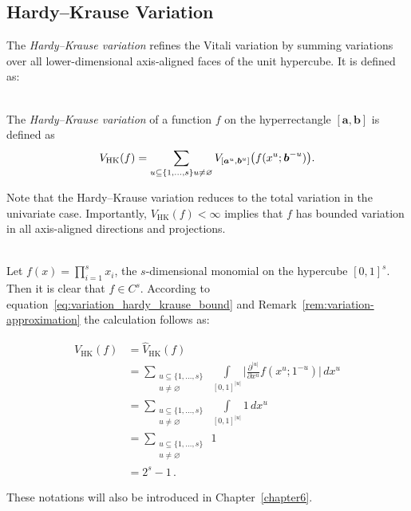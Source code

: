 \subsection{Hardy--Krause Variation}
\label{sec:hk-variation}

The \emph{Hardy--Krause variation } refines the Vitali variation by summing
variations over all lower-dimensional axis-aligned faces of the unit hypercube.
It is defined as:

\begin{definition} \ \\
The \emph{Hardy--Krause variation} of a function $f$ on the hyperrectangle
$[\boldsymbol{a},\boldsymbol{b}]$ is defined as
\begin{equation}
    \label{eq:hardy-krause-variation}
    V_{\mathrm{HK}}(f) = \sum_{\substack{u\subseteq \{1,\dots,s\}} \\{u\neq\varnothing}} V_{[\boldsymbol{a}^{u},\boldsymbol{b}^{u}]}\big(f(x^{u};\boldsymbol{b}^{-u})\big).
\end{equation}
\label{def:variation_hardy_krause}
\end{definition}

Note that the Hardy--Krause variation reduces to the total variation in the
univariate case. Importantly, $V_{\mathrm{HK}}(f) < \infty$ implies that $f$ has
bounded variation in all axis-aligned directions and projections.

\begin{example} \ \\
Let $f(x) = \prod\limits_{i=1}^s x_i$, the $s$-dimensional monomial on the
hypercube $[0,1]^s$. Then it is clear that $f \in C^s$. According to equation~\eqref{eq:variation_hardy_krause_bound} and
Remark~\ref{rem:variation-approximation} the calculation follows as:

\begin{align*}
    V_{\mathrm{HK}}(f) &= \widehat{V}_{\mathrm{HK}}(f) \\
    &= \sum\limits_{\substack{u \subseteq \{1,\dots,s\} \\ {u \neq \varnothing}}} \ \int\limits_{[0,1]^{|u|}} \bigg| \frac{\partial^{|u|}}{\partial x^u} f(x^u; 1^{-u}) \bigg| \, dx^u \\
    &= \sum\limits_{\substack{u \subseteq \{1,\dots,s\} \\ {u \neq \varnothing}}} \ \int\limits_{[0,1]^{|u|}} 1 \, dx^u \\
    &= \sum\limits_{\substack{u \subseteq \{1,\dots,s\} \\ {u \neq \varnothing}}}  \ 1 \\
    &= 2^s - 1 \,.
\end{align*}

These notations will also be introduced in Chapter~\ref{chapter6}.
\end{example}

